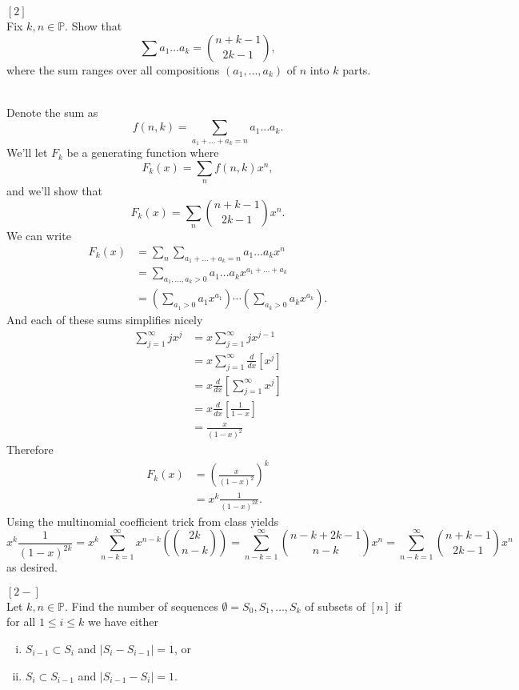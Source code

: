 \documentclass{article}
\newenvironment{problem}[2][Problem]{\begin{trivlist}
\item[\hskip \labelsep {\bfseries #1}\hskip \labelsep {\bfseries #2.}]}{\end{trivlist}}
\newenvironment{solution}[1][Solution.]{\begin{trivlist}
\item[\hskip \labelsep {\bfseries #1}]}{\end{trivlist}}
\begin{document}
\pagebreak
\begin{problem}{29} $[2]$ \\
  Fix $k, n \in \mathbb P$. Show that \[
    \sum a_1\hdots a_k = \binom{n + k - 1}{2k - 1},
  \] where the sum ranges over all compositions $(a_1, \hdots, a_k)$ of $n$
  into $k$ parts.
\end{problem}

\begin{solution} \text{} \\
  Denote the sum as \[
    f(n, k) = \sum_{a_1 + \hdots + a_k = n} a_1\hdots a_k.
  \]
  We'll let $F_k$ be a generating function where \[
    F_k(x) = \sum_n f(n,k) x^n,
  \] and we'll show that \[
    F_k(x) = \sum_n \binom{n + k - 1}{2k - 1} x^n.
  \]
  We can write \begin{align*}
    F_k(x)
    &= \sum_n \sum_{a_1 + \hdots + a_k = n} a_1\hdots a_k x^n \\
    &= \sum_{a_1, \hdots, a_k > 0} a_1\hdots a_k x^{a_1 + \hdots + a_k}\\
    &= \left(\sum_{a_1 > 0} a_1 x^{a_1}\right)\cdots\left(\sum_{a_k > 0} a_k x^{a_k}\right).
  \end{align*}
  And each of these sums simplifies nicely \begin{align*}
    \sum_{j = 1}^\infty j x^{j}
    &= x\sum_{j = 1}^\infty j x^{j - 1} \\
    &= x\sum_{j = 1}^\infty \frac{d}{dx}\left[x^j\right] \\
    &= x\frac{d}{dx}\left[\sum_{j = 1}^\infty x^j\right] \\
    &= x\frac{d}{dx}\left[\frac{1}{1-x}\right] \\
    &= \frac{x}{(1-x)^2}
  \end{align*}
  Therefore \begin{align*}
    F_k(x)
    &= \left(\frac{x}{(1-x)^2}\right)^k \\
    &= x^k\frac{1}{(1-x)^{2k}}.
  \end{align*}
  Using the multinomial coefficient trick from class yields \[
    x^k\frac{1}{(1-x)^{2k}}
    = x^k \sum_{n-k = 1}^\infty x^{n-k}\left(\!\!{{2k}\choose{n - k}}\!\!\right)
    = \sum_{n-k = 1}^\infty {{n - k + 2k - 1}\choose{n - k}}x^n
    = \sum_{n-k = 1}^\infty {{n + k - 1}\choose{2k - 1}}x^n
  \]
  as desired.
\end{solution}
\pagebreak
\begin{problem}{33 (a)} $[2-]$ \\
  Let $k,n \in \mathbb P$. Find the number of sequences
  $\emptyset = S_0, S_1, \hdots, S_k$ of subsets of $[n]$ if for all
  $1 \leq i \leq k$ we have either \begin{enumerate}[(i)]
    \item $S_{i - 1} \subset S_i$ and $|S_i - S_{i - 1}| = 1$, or
    \item $S_i \subset S_{i-1}$ and $|S_{i - 1} - S_i| = 1$.
  \end{enumerate}
\end{problem}
\end{document}
